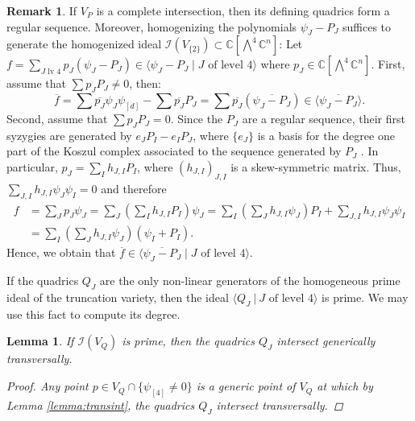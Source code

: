 \documentclass[11pt,reqno]{amsart}
\newtheorem{lemma}[theorem]{Lemma}
\theoremstyle{definition}
\newtheorem{remark}[theorem]{Remark}
\numberwithin{theorem}{section}
\numberwithin{equation}{section}
\begin{document}
\begin{remark}
If $V_P$ is a complete intersection, then its defining quadrics form a regular sequence. Moreover, homogenizing the polynomials $\psi_J- P_J$ suffices to generate the homogenized ideal $\mathcal I(V_{\{2\}}) \subset \mathbb C[\bigwedge^4\mathbb C^n]$: 
Let 
$f = \sum\limits_{J \textrm{ lv }4} p_J(\psi_J - P_J) \in \langle \psi_J - P_J \mid J \textrm{ of level }4\rangle$
where $p_J \in \mathbb C[\bigwedge^4\mathbb C^n]$. 
First, assume that $\sum p_J P_J \neq 0$, then:
$$\overline{f} = \sum \overline{p_J} \psi_J \psi_{[d]} - \sum \overline{p_J} P_J = \sum \overline{p_J} (\overline{\psi_J- P_J}) \in \langle \overline{\psi_J - P_J }\rangle.$$
Second, assume that $\sum p_J P_J = 0$.  Since the $P_J$ are a regular sequence, their first syzygies are generated by $e_J P_I - e_I P_J$, where $\{ e_J \}$ is a basis for the degree one part of the Koszul complex associated to the sequence generated by $P_J$ \cite[Section 13]{harris1992algebraic}. In particular, $p_J = \sum_I h_{J,I} P_I$, where $(h_{J,I})_{J,I}$ is a skew-symmetric matrix.
Thus, $\sum\limits_{J,I} h_{J,I} \psi_J \psi_I = 0$ and therefore
\begin{align*}
f 
&= 
\sum\limits_J p_J \psi _J 
=
\sum\limits_J \textstyle{\left( \sum\limits_I h_{J,I} P_I \right)} \psi_J 
= \sum\limits_{I} \textstyle{\left( \sum\limits_J  h_{J,I} \psi_J \right)} P_I + \sum\limits_{J,I} h_{J,I} \psi_J \psi_I\\ 
&= \sum\limits_I \textstyle{\left( \sum\limits_J h_{J,I} \psi_J \right)} (\psi_I + P_I).
\end{align*}
Hence, we obtain that  $\overline f \in \langle \overline{\psi_J - P_J} \mid J \textrm{ of level }4\rangle$.
\end{remark}

\noindent If the quadrics $Q_J$ are the only non-linear generators of the homogeneous prime ideal of the truncation variety, then the ideal $\langle Q_J \ | \ J \textrm{ of level 4} \rangle$ is prime. We may use this fact to compute its degree.

\begin{lemma}\label{lemma: gen transint}
If $\mathcal I(V_Q)$ is prime, then the quadrics $Q_J$ intersect generically transversally. 

\begin{proof}
Any point $p \in V_Q \cap \{\psi_{[4]} \neq 0 \}$ is a generic point of $V_Q$ at which by Lemma \ref{lemma:transint}, the quadrics $Q_J$ intersect transversally.
\end{proof}
\end{lemma}
\end{document}
